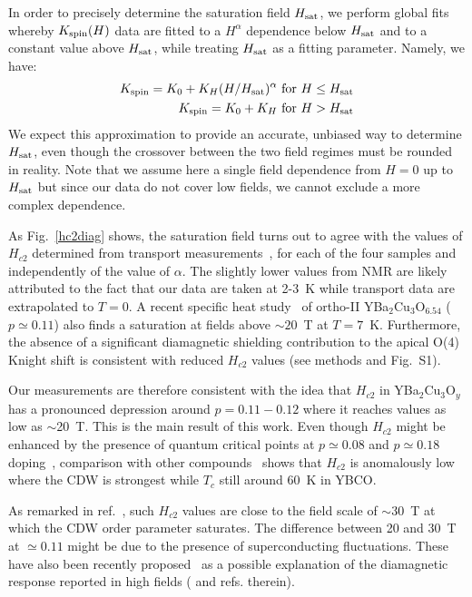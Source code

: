 \documentclass[superscriptaddress,twocolumn,prl,preprintnumbers,amsmath,amssymb]{revtex4}
\begin{document}
In order to precisely determine the saturation field $H_{\rm sat}$, we perform global fits whereby $K_{\rm spin}(H)$ data are fitted to a $H^\alpha$ dependence below $H_{\rm sat}$ and to a constant value above $H_{\rm sat}$, while treating $H_{\rm sat}$ as a fitting parameter. Namely, we have:
\begin{equation}
\begin{split}
K_{\rm spin} = K_0 + K_H (H/H_{\rm sat})^{\alpha}~\text{for}~H \leq H_{\rm sat}\\
K_{\rm spin} = K_0 + K_H ~\text{for}~H > H_{\rm sat}
\end{split}
\end{equation}
We expect this approximation to provide an accurate, unbiased way to determine $H_{\rm sat}$, even though the crossover between the two field regimes must be rounded in reality. Note that we assume here a single field dependence from $H=0$ up to $H_{\rm sat}$ but since our data do not cover low fields, we cannot exclude a more complex dependence.

As Fig.~\ref{hc2diag} shows, the saturation field turns out to agree with the values of $H_{c2}$ determined from transport measurements~\cite{Grissonnanche14,Ramshaw12}, for each of the four samples and independently of the value of $\alpha$. The slightly lower values from NMR are likely attributed to the fact that our data are taken at 2-3~K while transport data are extrapolated to $T=0$. A recent specific heat study~\cite{Marcenat15} of ortho-II YBa$_2$Cu$_3$O$_{6.54}$ ($p\simeq0.11$) also finds a saturation at fields above $\sim 20$~T at $T=7$~K. Furthermore, the absence of a significant diamagnetic shielding contribution to the apical O(4) Knight shift is consistent with reduced $H_{c2}$ values (see methods and Fig.~S1).

Our measurements are therefore consistent with the idea that $H_{c2}$ in YBa$_2$Cu$_3$O$_{y}$ has a pronounced depression around $p=0.11-0.12$ where it reaches values as low as $\sim$20~T. This is the main result of this work. Even though $H_{c2}$ might be enhanced by the presence of quantum critical points at $p\simeq0.08$ and $p\simeq0.18$ doping~\cite{Sebastian08,Ramshaw15,Grissonnanche14}, comparison with other compounds~\cite{Tafti14} shows that $H_{c2}$ is anomalously low where the CDW is strongest while $T_c$ still around 60~K in YBCO.

As remarked in ref.~\cite{Wu13}, such $H_{c2}$ values are close to the field scale of $\sim$30~T at which the CDW order parameter saturates. The difference between 20 and 30~T at $\simeq 0.11$ might be due to the presence of superconducting fluctuations. These have also been recently proposed~\cite{Yu15} as a possible explanation of the diamagnetic response reported in high fields (\cite{Yu16} and refs. therein).
\end{document}
